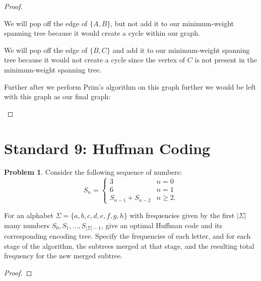 \documentclass[11pt]{article}
\theoremstyle{definition}
\theoremstyle{definition}
\newtheorem{required}{Problem}
\theoremstyle{definition}
\begin{document}
\begin{proof}
\begin{center}
We will pop off the edge of $\{A, B\}$, but not add it to our minimum-weight spanning tree because it would create a cycle within our graph.
\end{center}

\begin{center}
We will pop off the edge of $\{B, C\}$ and add it to our minimum-weight spanning tree because it would not create a cycle since the vertex of $C$ is not present in the minimum-weight spanning tree.
\end{center}

Further after we perform Prim's algorithm on this graph further we would be left with this graph as our final graph: \\
\begin {center}
\end{center}

\end{proof}





\newpage
\section{Standard 9: Huffman Coding}
\begin{required}
Consider the following sequence of numbers:
\[
S_n = \begin{cases}
3 & n = 0 \\
6 & n = 1 \\
S_{n-1} + S_{n-2} & n \geq 2.
\end{cases}
\]

For an alphabet $\Sigma = \{a,b,c,d,e,f,g,h\}$ with frequencies given by the first $|\Sigma|$ many numbers $S_0, S_1, \dotsc, S_{|\Sigma|-1}$, give an optimal Huffman code and its corresponding encoding tree. Specify the frequencies of each letter, and for each stage of the algorithm, the subtrees merged at that stage, and the resulting total frequency for the new merged subtree.
\end{required}

\begin{proof}
\end{proof}



\end{document}
